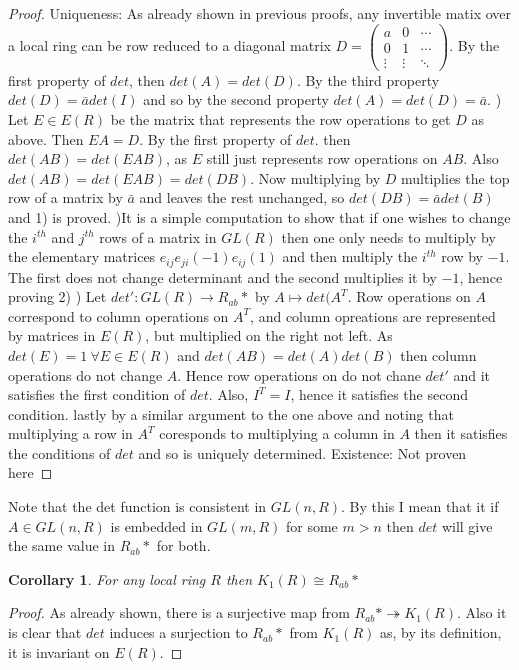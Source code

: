 \documentclass[a4paper,10pt]{article}
\newtheorem{cor}[thm]{Corollary}
\begin{document}
\begin{proof}
Uniqueness: As already shown in previous proofs, any invertible matix over a local ring can be row reduced to a diagonal matrix $D=\begin{pmatrix} a & 0 & \cdots \\ 0 & 1 & \cdots \\ \vdots & \vdots & \ddots \end{pmatrix}$. By the first property of $det$, then $det(A)=det(D)$. By the third property $det(D)=\bar{a}det(I)$ and so by the second property $det(A)=det(D)=\bar{a}$.
) Let $E\in E(R)$ be the matrix that represents the row operations to get $D$ as above. Then $EA=D$. By the first property of $det$. then $det(AB)=det(EAB)$, as $E$ still just represents row operations on $AB$. Also $det(AB)=det(EAB)=det(DB)$. Now multiplying by $D$ multiplies the top row of a matrix by $\bar{a}$ and leaves the rest unchanged, so $det(DB)=\bar{a}det(B)$ and 1) is proved.
)It is a simple computation to show that if one wishes to change the $i^{th}$ and $j^{th}$ rows of a matrix in $GL(R)$ then one only needs to multiply by the elementary matrices $e_{ij}e_{ji}(-1)e_{ij}(1)$ and then multiply the $i^{th}$ row by $-1$. The first does not change determinant and the second  multiplies it by $-1$, hence proving 2)
) Let $det':GL(R)\rightarrow R_{ab}*$ by $A\mapsto det(A^{T}$. Row operations on $A$ correspond to column operations on $A^{T}$, and column opreations are represented by matrices in $E(R)$,  but multiplied on the right not left. As $det(E)=1\ \forall E\in E(R)$ and $det(AB)=det(A)det(B)$ then column operations do not change $A$. Hence row operations on do not chane $det'$ and it satisfies the first condition of $det$. Also, $I^{T}=I$, hence it satisfies the second condition. lastly by a similar argument to the one above and noting that multiplying a row in $A^{T}$ coresponds to multiplying a column in $A$ then it satisfies the conditions of $det$ and so is uniquely determined.
Existence: Not proven here
\end{proof}

Note that the det function is consistent in $GL(n,R)$. By this I mean that it if $A\in GL(n,R)$ is embedded in $GL(m,R)$ for some $m>n$ then $det$ will give the same value in $R_{ab}*$ for both.

\begin{cor}
For any local ring $R$ then $K_{1}(R)\cong R_{ab}*$
\end{cor}
\begin{proof}
As already shown, there is a surjective map from $R_{ab}*\twoheadrightarrow K_{1}(R)$. Also it is clear that $det$ induces a surjection to $R_{ab}*$ from $K_{1}(R)$ as, by its definition, it is invariant on $E(R)$.
\end{proof}
\end{document}
